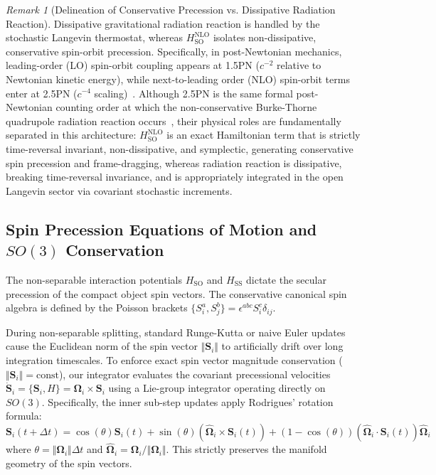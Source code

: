 \documentclass[11pt,a4paper,reqno]{article}
\theoremstyle{plain}
\theoremstyle{definition}
\theoremstyle{remark}
\newtheorem{remark}[theorem]{Remark}
\numberwithin{equation}{section}
\begin{document}
\begin{remark}[Delineation of Conservative Precession vs. Dissipative Radiation Reaction]
Dissipative gravitational radiation reaction is handled by the stochastic Langevin thermostat, whereas $H_{\mathrm{SO}}^{\mathrm{NLO}}$ isolates non-dissipative, conservative spin-orbit precession. Specifically, in post-Newtonian mechanics, leading-order (LO) spin-orbit coupling appears at 1.5PN ($c^{-2}$ relative to Newtonian kinetic energy), while next-to-leading order (NLO) spin-orbit terms enter at 2.5PN ($c^{-4}$ scaling)~\cite{FayeBlanchetBuonanno2006,DamourJaranowskiSchafer2008}. Although 2.5PN is the same formal post-Newtonian counting order at which the non-conservative Burke-Thorne quadrupole radiation reaction occurs~\cite{BurkeThorne1970}, their physical roles are fundamentally separated in this architecture: $H_{\mathrm{SO}}^{\mathrm{NLO}}$ is an exact Hamiltonian term that is strictly time-reversal invariant, non-dissipative, and symplectic, generating conservative spin precession and frame-dragging, whereas radiation reaction is dissipative, breaking time-reversal invariance, and is appropriately integrated in the open Langevin sector via covariant stochastic increments.
\end{remark}

\subsection{Spin Precession Equations of Motion and \texorpdfstring{$SO(3)$}{SO(3)} Conservation}
\label{subsec:spin_precession}
The non-separable interaction potentials $H_{\mathrm{SO}}$ and $H_{\mathrm{SS}}$ dictate the secular precession of the compact object spin vectors. The conservative canonical spin algebra is defined by the Poisson brackets $\{ S_i^a, S_j^b \} = \epsilon^{abc} S_i^c \delta_{ij}$. 

During non-separable splitting, standard Runge-Kutta or naive Euler updates cause the Euclidean norm of the spin vector $\Vert\bm{S}_i\Vert$ to artificially drift over long integration timescales. To enforce exact spin vector magnitude conservation ($\Vert\bm{S}_i\Vert = \text{const}$), our integrator evaluates the covariant precessional velocities $\dot{\bm{S}}_i = \{ \bm{S}_i, H \} = \bm{\Omega}_i \times \bm{S}_i$ using a Lie-group integrator operating directly on $SO(3)$. Specifically, the inner sub-step updates apply Rodrigues' rotation formula:
\begin{equation}
\bm{S}_i(t + \Delta t) = \cos(\theta) \bm{S}_i(t) + \sin(\theta) (\hat{\bm{\Omega}}_i \times \bm{S}_i(t)) + (1 - \cos(\theta)) (\hat{\bm{\Omega}}_i \cdot \bm{S}_i(t)) \hat{\bm{\Omega}}_i
\end{equation}
where $\theta = \Vert\bm{\Omega}_i\Vert \Delta t$ and $\hat{\bm{\Omega}}_i = \bm{\Omega}_i / \Vert\bm{\Omega}_i\Vert$. This strictly preserves the manifold geometry of the spin vectors. 
\end{document}
